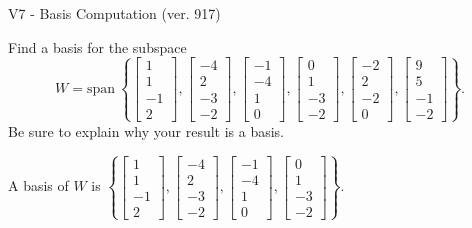 \begin{exercise}
  \begin{exerciseTitle}V7 - Basis Computation (ver. 917)\end{exerciseTitle}
  \begin{exerciseStatement}
    Find a basis for the subspace 
\[W=\mathrm{span}\ \left\{\left[\begin{array}{r}
1 \\
1 \\
-1 \\
2
\end{array}\right] , \left[\begin{array}{r}
-4 \\
2 \\
-3 \\
-2
\end{array}\right] , \left[\begin{array}{r}
-1 \\
-4 \\
1 \\
0
\end{array}\right] , \left[\begin{array}{r}
0 \\
1 \\
-3 \\
-2
\end{array}\right] , \left[\begin{array}{r}
-2 \\
2 \\
-2 \\
0
\end{array}\right] , \left[\begin{array}{r}
9 \\
5 \\
-1 \\
-2
\end{array}\right]\right\}.\]
 Be sure to explain why your result is a basis.


  \end{exerciseStatement}
  \begin{exerciseAnswer}
   A basis of \(W\) is  \(\left\{\left[\begin{array}{r}
1 \\
1 \\
-1 \\
2
\end{array}\right] , \left[\begin{array}{r}
-4 \\
2 \\
-3 \\
-2
\end{array}\right] , \left[\begin{array}{r}
-1 \\
-4 \\
1 \\
0
\end{array}\right] , \left[\begin{array}{r}
0 \\
1 \\
-3 \\
-2
\end{array}\right]\right\}\).
  


  \end{exerciseAnswer}
\end{exercise}